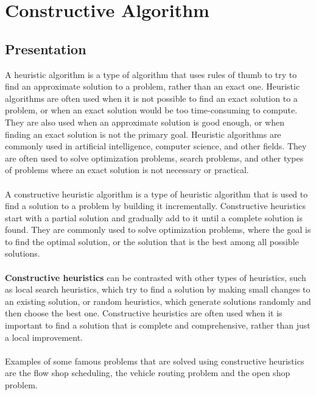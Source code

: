 
\section{Constructive Algorithm}


\subsection{Presentation}

    A heuristic algorithm is a type of algorithm that uses rules of thumb to try to find an approximate solution to a problem, rather than an exact one. Heuristic algorithms are often used when it is not possible to find an exact solution to a problem, or when an exact solution would be too time-consuming to compute. They are also used when an approximate solution is good enough, or when finding an exact solution is not the primary goal. Heuristic algorithms are commonly used in artificial intelligence, computer science, and other fields. They are often used to solve optimization problems, search problems, and other types of problems where an exact solution is not necessary or practical.
    \\ \\
    A constructive heuristic algorithm is a type of heuristic algorithm that is used to find a solution to a problem by building it incrementally. Constructive heuristics start with a partial solution and gradually add to it until a complete solution is found. They are commonly used to solve optimization problems, where the goal is to find the optimal solution, or the solution that is the best among all possible solutions.
    \\ \\
    \textbf{Constructive heuristics} can be contrasted with other types of heuristics, such as local search heuristics, which try to find a solution by making small changes to an existing solution, or random heuristics, which generate solutions randomly and then choose the best one. Constructive heuristics are often used when it is important to find a solution that is complete and comprehensive, rather than just a local improvement.
    \\ \\
    Examples of some famous problems that are solved using constructive heuristics are the flow shop scheduling, the vehicle routing problem and the open shop problem.

